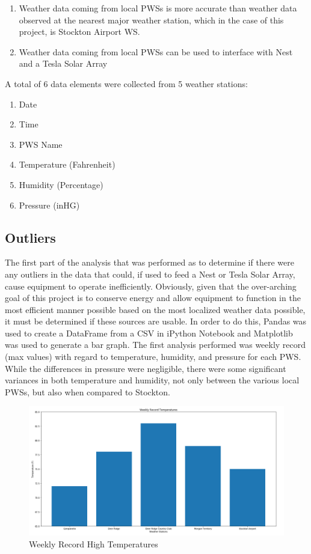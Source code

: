 \documentclass[sigconf]{acmart}
\begin{document}
\begin{enumerate}
    \item Weather data coming from local PWSs is more accurate than weather data observed at the nearest major weather station, which in the case of this project, is Stockton Airport WS.
    \item Weather data coming from local PWSs can be used to interface with Nest and a Tesla Solar Array
\end{enumerate}

A total of 6 data elements were collected from 5 weather stations:

\begin{enumerate}
    \item Date
    \item Time
    \item PWS Name
    \item Temperature (Fahrenheit)
    \item Humidity (Percentage)
    \item Pressure (inHG)
\end{enumerate}

\subsection{Outliers}

The first part of the analysis that was performed as to determine if there were any outliers in the data that could, if used to feed a Nest or Tesla Solar Array, cause equipment to operate inefficiently. Obviously, given that the over-arching goal of this project is to conserve energy and allow equipment to function in the most efficient manner possible based on the most localized weather data possible, it must be determined if these sources are usable. In order to do this, Pandas was used to create a DataFrame from a CSV in iPython Notebook and Matplotlib was used to generate a bar graph. The first analysis performed was weekly record (max values) with regard to temperature, humidity, and pressure for each PWS. While the differences in pressure were negligible, there were some significant variances in both temperature and humidity, not only between the various local PWSs, but also when compared to Stockton. 

\begin{figure}[htb]
    \centering
    \includegraphics[width=\columnwidth]{images/WK_REC_TEMP.PNG}
    \caption{Weekly Record High Temperatures}
\end{figure}
\end{document}
